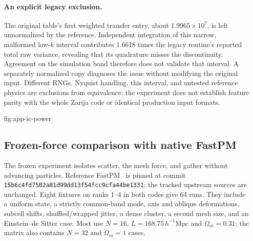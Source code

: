 \paragraph{An explicit legacy exclusion.}
The original table's first weighted transfer entry, about $1.9965\times10^7$,
is left unnormalized by the reference.  Independent integration of this narrow,
malformed low-$k$ interval contributes 1.6618 times the legacy routine's reported
total raw variance, revealing that its quadrature misses the discontinuity.
Agreement on the simulation band therefore does not validate that interval.
A separately normalized copy diagnoses the issue without modifying the original
input.  Different RNGs, Nyquist handling, this interval, and untested reference
physics are exclusions from equivalence; the experiment does not establish
feature parity with the whole Zarija code or identical production input formats.

{fig:app-ic-power}


\subsection{Frozen-force comparison with native FastPM}
\label{app:force}

The frozen experiment isolates scatter, the mesh force, and gather without
advancing particles.  Reference FastPM~\cite{feng2016fastpm} is pinned at commit
\texttt{15b6c4fd7502a81d99dd13f54fcc9cfa44be1331}; the tracked upstream sources
are unchanged.  Eight fixtures on ranks 1--4 in both codes give 64 runs.
They include a uniform state, a strictly common-band mode, axis and oblique
deformations, subcell shifts, shuffled/wrapped jitter, a dense cluster, a second
mesh size, and an Einstein--de Sitter case.  Most use $N=16$,
$L=168.75\,h^{-1}\mathrm{Mpc}$ and $\Omega_m=0.31$; the matrix also contains
$N=32$ and $\Omega_m=1$ cases.

